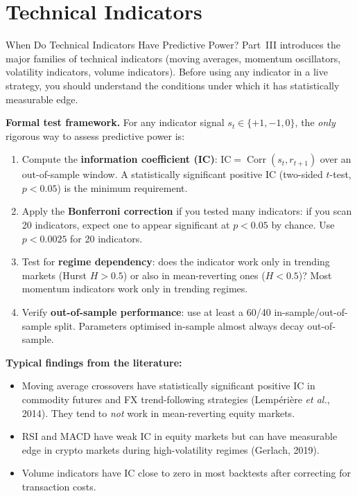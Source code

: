 \documentclass[12pt,a4paper,openany]{report}
\theoremstyle{definition}
\newcommand{\Corr}{\operatorname{Corr}}
\begin{document}

%
%
\part{Technical Indicators}

\begin{warningbox}{When Do Technical Indicators Have Predictive Power?}
Part~III introduces the major families of technical indicators (moving averages, momentum oscillators, volatility indicators, volume indicators). Before using any indicator in a live strategy, you should understand the conditions under which it has statistically measurable edge.

\textbf{Formal test framework.} For any indicator signal $s_t \in \{+1, -1, 0\}$, the \emph{only} rigorous way to assess predictive power is:
\begin{enumerate}[label=\arabic*.]
  \item Compute the \textbf{information coefficient (IC)}: $\text{IC} = \Corr(s_t, r_{t+1})$ over an out-of-sample window. A statistically significant positive IC (two-sided $t$-test, $p < 0.05$) is the minimum requirement.
  \item Apply the \textbf{Bonferroni correction} if you tested many indicators: if you scan 20 indicators, expect one to appear significant at $p < 0.05$ by chance. Use $p < 0.0025$ for 20 indicators.
  \item Test for \textbf{regime dependency}: does the indicator work only in trending markets (Hurst $H > 0.5$) or also in mean-reverting ones ($H < 0.5$)? Most momentum indicators work only in trending regimes.
  \item Verify \textbf{out-of-sample performance}: use at least a 60/40 in-sample/out-of-sample split. Parameters optimised in-sample almost always decay out-of-sample.
\end{enumerate}

\textbf{Typical findings from the literature:}
\begin{itemize}
  \item Moving average crossovers have statistically significant positive IC in commodity futures and FX trend-following strategies (Lempérière \emph{et al.}, 2014). They tend to \emph{not} work in mean-reverting equity markets.
  \item RSI and MACD have weak IC in equity markets but can have measurable edge in crypto markets during high-volatility regimes (Gerlach, 2019).
  \item Volume indicators have IC close to zero in most backtests after correcting for transaction costs.
\end{itemize}


\end{warningbox}
\end{document}
